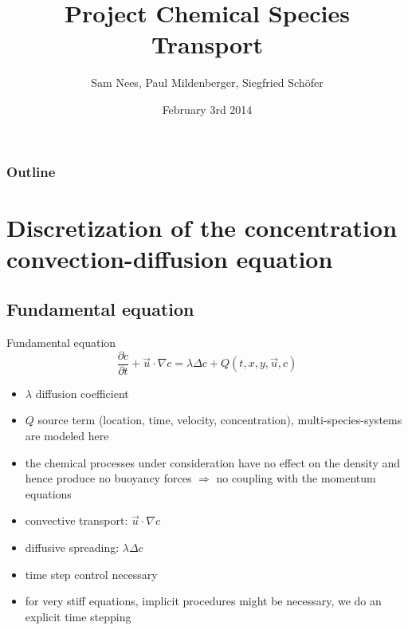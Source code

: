 \documentclass[t,mathserif]{beamer}
\author{Sam Nees, Paul Mildenberger, Siegfried Sch\"ofer}
\institute[LSS]{Chair for System Simulation}
\title[NuSiF]{Project Chemical Species Transport}
\date[3/2/2014]{February 3rd 2014}
\begin{document}


\begin{frame}[plain,c]
   \titlepage
\end{frame}


\begin{frame}[squeeze]
   \frametitle{Outline}\tableofcontents
\end{frame}



\section{Discretization of the concentration convection-diffusion equation}
\subsection{Fundamental equation}
\begin{frame}[allowframebreaks]{Fundamental equation}
	\begin{equation}
\frac{\partial c}{\partial t} + \vec{u} \cdot \nabla c = \lambda \Delta c + Q(t,x,y,\vec{u},c)
\end{equation}
\begin{itemize}
	\item $\lambda$ diffusion coefficient
	\item $Q$ source term (location, time, velocity, concentration), multi-species-systems are modeled here
	\item the chemical processes under consideration have no effect on the density and hence produce no buoyancy forces $\Rightarrow$ no coupling with the momentum equations
	\item convective transport: $\vec{u} \cdot \nabla c$
	\item diffusive spreading: $\lambda \Delta c$
	\item time step control necessary
    \item for very stiff equations, implicit procedures might be necessary, we do an explicit time stepping
\end{itemize}
\end{frame}
\end{document}
